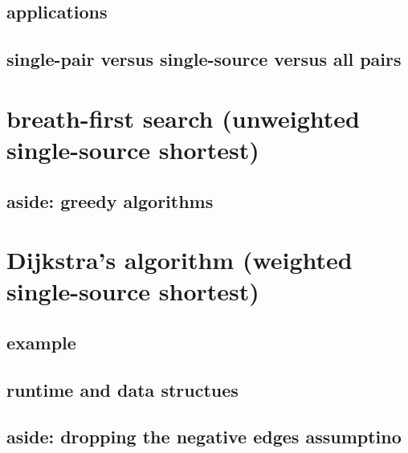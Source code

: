 

\subsection{applications}



\subsection{single-pair versus single-source versus all pairs}



\section{breath-first search (unweighted single-source shortest)}



\subsection{aside: greedy algorithms}




\section{Dijkstra's algorithm (weighted single-source shortest)}



\subsection{example}



\subsection{runtime and data structues}


\subsection{aside: dropping the negative edges assumptino}

